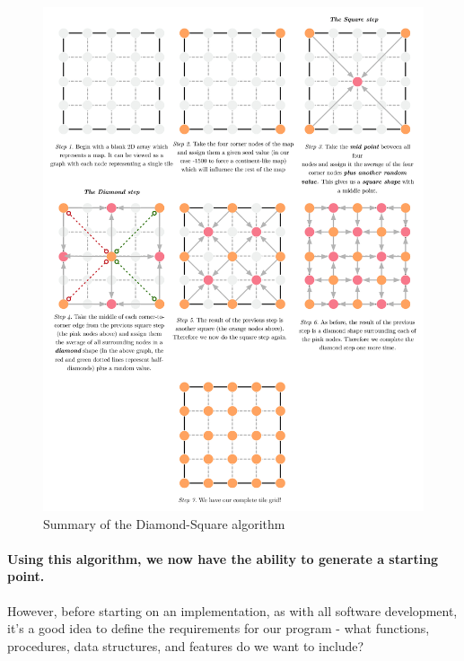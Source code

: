 \documentclass{article}
\begin{document}
\begin{figure}[H]
	\centering
	\includegraphics[width=0.9\linewidth,trim=4 4 4 4,clip]{diamondsquare.jpg}
	\renewcommand{\figurename}{Example}
	\caption{Summary of the Diamond-Square algorithm}
\end{figure}
	
\paragraph{Using this algorithm, we now have the ability to generate a starting point.}
However, before starting on an implementation, as with all software development, it's a good idea to define the requirements for our program - what functions, procedures, data structures, and features do we want to include?
	
\end{document}
